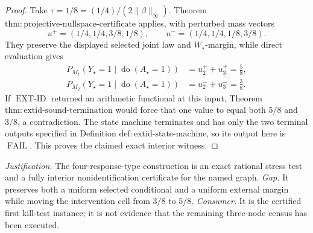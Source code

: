 \documentclass{article}
\begin{document}
\begin{proof}
Take \(\tau=1/8=(1/4)/(2\lVert\beta\rVert_\infty)\).  Theorem \(\mathrm{thm{:}projective\text{-}nullspace\text{-}certificate}\) applies, with perturbed mass vectors
\[
 u^+=(1/4,1/4,3/8,1/8),
 \qquad
 u^-=(1/4,1/4,1/8,3/8).
\]
They preserve the displayed selected joint law and \(W_\star\)-margin, while direct evaluation gives
\[
 \begin{aligned}
 P_{M_1}(Y_\star=1\mid\operatorname{do}(A_\star=1))
 &=u_2^++u_3^+=\frac58,\\
 P_{M_2}(Y_\star=1\mid\operatorname{do}(A_\star=1))
 &=u_2^-+u_3^-=\frac38.
 \end{aligned}
\]
If \(\operatorname{EXT\text{-}ID}\) returned an arithmetic functional at this input, Theorem \(\mathrm{thm{:}extid\text{-}sound\text{-}termination}\) would force that one value to equal both \(5/8\) and \(3/8\), a contradiction.  The state machine terminates and has only the two terminal outputs specified in Definition \(\mathrm{def{:}extid\text{-}state\text{-}machine}\), so its output here is \(\operatorname{FAIL}\).  This proves the claimed exact interior witness.
\end{proof}
\par\smallskip\noindent \textit{Justification.} The four-response-type construction is an exact rational stress test and a fully interior nonidentification certificate for the named graph. \textit{Gap.} It preserves both a uniform selected conditional and a uniform external margin while moving the intervention cell from \(3/8\) to \(5/8\). \textit{Consumer.} It is the certified first kill-test instance; it is not evidence that the remaining three-node census has been executed.
\end{document}
